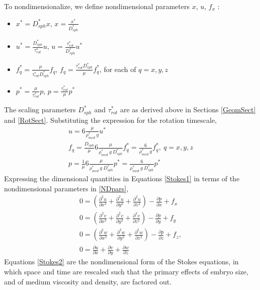 \documentclass[10pt,a4paper]{article}
\def\non{\nonumber}
\def\p{\partial}
\begin{document}
To nondimensionalize, we define nondimensional parameters $x$, $u$, $f_x$ :
\begin{itemize}
	\item $x^* = D_{sph}^* x$, $x = \frac{x^*}{D_{sph}^*}$
	\item $u^* = \frac{D_{sph}^*}{\tau^*_{rot}} u$, $u = \frac{\tau^*_{rot}}{D_{sph}^*} u^*$
	\item $f_q^* = \frac{\mu}{\tau^*_{rot} D_{sph}^*} f_q$, $f_q = \frac{\tau^*_{rot} D_{sph}^*}{\mu} f_q^*$, for each of $q = x, y, z$
	\item $p^* = \frac{\mu}{\tau^*_{rot}} p$, $p = \frac{\tau^*_{rot}}{\mu} p^*$
\end{itemize}
The scaling parameters $D_{sph}^*$ and $\tau^*_{rot}$ are as derived above in Sections \ref{GeomSect} and \ref{RotSect}.
Substituting the expression for the rotation timescale,
\begin{eqnarray}\label{NDpars}
	u = 6 \frac{\mu}{\rho^*_{med} ~ g } u^* \non \\
	f_q = \frac{D_{sph}}{\mu} 6 \frac{\mu}{\rho^*_{med} ~ g ~ D_{sph}^*} f_q^* = \frac{6}{\rho^*_{med}~  g} f_q^*, ~ q = x, y, z \non \\
	p = \frac{1}{\mu} 6 \frac{\mu}{\rho^*_{med} ~ g ~ D_{sph}^*} p^* = \frac{6}{\rho^*_{med} ~ g ~ D_{sph}^*} p^*
\end{eqnarray}
Expressing the dimensional quantities in Equations \ref{Stokes1} in terms of the nondimensional parameters in \ref{NDpars}, 
\begin{eqnarray}\label{Stokes2}
	0 = \left( \frac{\p^2 u}{\p x^2}+\frac{\p^2 u}{\p y^2}+\frac{\p^2 u}{\p z^2} \right) - \frac{\p p}{\p x} + f_x \non \\
	0 = \left( \frac{\p^2 v}{\p x^2}+\frac{\p^2 v}{\p y^2}+\frac{\p^2 v}{\p z^2} \right) - \frac{\p p}{\p y} + f_y \non \\
	0 = \left( \frac{\p^2 w}{\p x^2}+\frac{\p^2 w}{\p y^2}+\frac{\p^2 w}{\p z^2} \right) - \frac{\p p}{\p z} + f_z , \non \\
	0 =  \frac{\p u}{\p {x}}+\frac{\p v}{\p {y}}+\frac{\p w}{\p {z}}
\end{eqnarray}
Equations \ref{Stokes2} are the nondimensional form of the Stokes equations, in which space and time are rescaled such that the primary effects of embryo size, and of medium viscosity and density, are factored out.  
\end{document}
